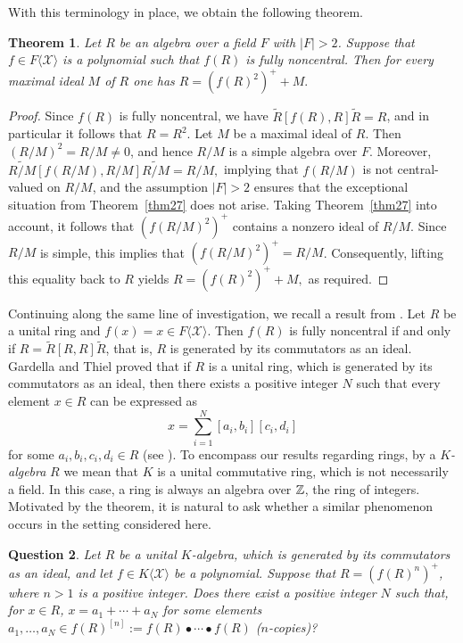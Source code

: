 \documentclass[11pt]{article}
\newtheorem{theorem}{Theorem}
\newtheorem{question}[theorem]{Question}
\theoremstyle{definition}
\begin{document}
{{{{				With this terminology in place, we obtain the following theorem.
				
				\begin{theorem}\label{thm31}
					Let $R$ be an algebra over a field $F$ with $|F|>2$. Suppose that $f\in F\langle \mathcal{X} \rangle$ is a polynomial such that $f(R)$ is fully noncentral. Then for every maximal ideal $M$ of $R$ one has
					$R = (f(R)^2)^+ + M.$
				\end{theorem}
				
				\begin{proof}
					Since $f(R)$ is fully noncentral, we have $\widetilde{R}[f(R),R]\widetilde{R} = R$, and in particular it follows that $R=R^2$. Let $M$ be a maximal ideal of $R$. Then $(R/M)^2 = R/M \neq 0$, and hence $R/M$ is a simple algebra over $F$. Moreover,
$
\widetilde{R/M}[f(R/M),R/M]\widetilde{R/M} = R/M,
$
implying that
$f(R/M)$ is not central-valued on $R/M$, and the assumption $|F|>2$ ensures that the exceptional situation from Theorem~\ref{thm27} does not arise. Taking Theorem~\ref{thm27} into account, it follows that $(f(R/M)^2)^+$ contains a nonzero ideal of $R/M$. Since $R/M$ is simple, this implies that $(f(R/M)^2)^+ = R/M$. Consequently, lifting this equality back to $R$ yields $R = (f(R)^2)^+ + M,$ as required.
				\end{proof}
				
				Continuing along the same line of investigation, we recall a result from \cite[Theorem~3.4]{Pa_Ga_25}. Let $R$ be a unital ring and $f(x)=x \in F\langle \mathcal{X} \rangle$. Then $f(R)$ is fully noncentral if and only if $R=\widetilde R[R, R]\widetilde R$, that is, $R$ is generated by its commutators as an ideal.
				Gardella and Thiel proved that if $R$ is a unital ring, which is generated by its commutators as an ideal, then
				there exists a positive integer $N$ such that every element $x \in R$ can be expressed as
				$$\displaystyle x = \sum_{i=1}^N[a_i, b_i][c_i, d_i]$$ for some $a_i, b_i, c_i, d_i\in R$ (see \cite[Theorem A]{Pa_Ga_25}).
				To encompass our results regarding rings, by a {\it $K$-algebra} $R$ we mean that  $K$ is a unital commutative ring, which is not necessarily a field. In this case, a ring is always an algebra over $\Bbb Z$, the ring of integers.
				Motivated by the theorem, it is natural to ask whether a similar phenomenon occurs in the setting considered here.
				
				\begin{question}\label{qu1}
					Let $R$ be a unital $K$-algebra,  which  is generated by its commutators as an ideal, and let $f \in K\langle \mathcal{X} \rangle$ be a polynomial. Suppose that $R=(f(R)^n)^+$, where $n>1$ is a positive integer.
					Does there exist a positive integer $N$ such that, for $x \in R$, $\displaystyle x =a_1+\cdots+a_N$
					for some elements $a_1, \ldots, a_N \in f(R)^{[n]}:=f(R)\bullet \cdots\bullet  f(R)$ ($n$-copies)?
				\end{question}
				
}}}}
\end{document}
